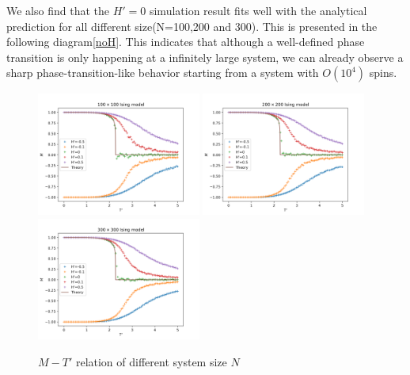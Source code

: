 \documentclass[11pt]{article}
\begin{document}
We also find that the $H'=0$ simulation result fits well with the analytical prediction for all different size(N=100,200 and 300). This is presented in the following diagram\ref{noH}. This indicates that although a well-defined phase transition is only happening at a infinitely large system, we can already observe a sharp phase-transition-like behavior starting from a system with $O(10^4)$ spins.


\begin{figure}
    \centering
    \includegraphics[width=0.48\textwidth]{plots/M-T_withB_diagram(latest,100).png}\hfill
    \includegraphics[width=0.48\textwidth]{plots/M-T_withB_diagram(latest,200).png}\hfill
    \includegraphics[width=0.48\textwidth]{plots/M-T_withB_diagram(latest,300).png}
    \caption{$M-T'$ relation of different system size $N$}
    \label{M-T/N}
\end{figure}
\end{document}
